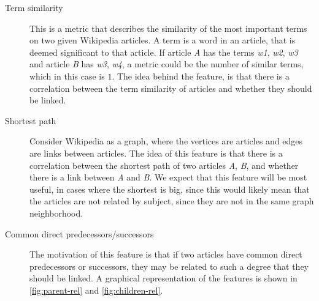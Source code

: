 \begin{description}
    \item[Term similarity] This is a metric that describes the similarity of the most important terms on two given Wikipedia articles. A term is a word in an article, that is deemed significant to that article. If article \emph{A} has the terms \emph{w1}, \emph{w2}, \emph{w3} and article \emph{B} has \emph{w3}, \emph{w4}, a metric could be the number of similar terms, which in this case is $1$. The idea behind the feature, is that there is a correlation between the term similarity of articles and whether they should be linked.
    \item[Shortest path] Consider Wikipedia as a graph, where the vertices are articles and edges are links between articles. The idea of this feature is that there is a correlation between the shortest path of two articles \emph{A}, \emph{B}, and whether there is a link between \emph{A} and \emph{B}. We expect that this feature will be most useful, in cases where the shortest is big, since this would likely mean that the articles are not related by subject, since they are not in the same graph neighborhood.
    \item[Common direct predecessors/successors] The motivation of this feature is that if two articles have common direct predecessors or successors, they may be related to such a degree that they should be linked. A graphical representation of the features is shown in \cref{fig:parent-rel} and \cref{fig:children-rel}.
\end{description}

